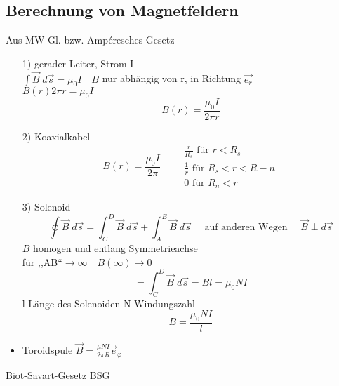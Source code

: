\documentclass[titlepage,12pt,a4paper,ngerman]{report}
\newcommand{\tx}[1]{\textrm{#1}}
\begin{document}
\subsection{Berechnung von Magnetfeldern}
Aus MW-Gl. bzw. Ampéresches Gesetz
\begin{itemize}
	\item[1)] gerader Leiter, Strom I\\
	$ \int\vec{B} \; d \vec{s} = \mu _0 I \quad B $ nur abhängig von r, in Richtung $ \vec{e_r} $\\
	$ B(r) 2 \pi r = \mu_0 I $\\
	$$\boxed{B(r) = \frac{\mu_0 I}{2 \pi r}}$$
	\item[2)] Koaxialkabel
	$$B(r) = \frac{\mu_0 I}{2 \pi} \qquad \substack{\frac{r}{R_s} \tx{ für } r<R_s \\\frac{1}{r} \tx{ für } R_s < r < R-n \\ 0 \tx{ für } R_n < r}$$
	\item[3)] Solenoid
	$$\oint \vec{B} \; d \vec{s} = \int_{C}^{D} \vec{B} \; d \vec{s} + \int_{A}^{B} \vec{B} \; d \vec{s} \quad \tx{ auf anderen Wegen } \quad \vec{B} \perp d\vec{s}$$
	$B$ homogen und entlang Symmetrieachse \\
	für ,,AB``$ \rightarrow \infty  \quad B(\infty) \rightarrow 0$\\
	$$ = \int_{C}^{D} \vec{B}\; d \vec{s} = B l = \mu_0 N I$$
	l Länge des Solenoiden N Windungszahl
	$$\boxed{ B = \frac{\mu_0 N I }{l}}$$
	\item Toroidspule
	$ \vec{B} = \frac{\mu N I }{2 \pi R} \vec{e}_\varphi$
\end{itemize}
\underline{Biot-Savart-Gesetz BSG}\\
\end{document}
